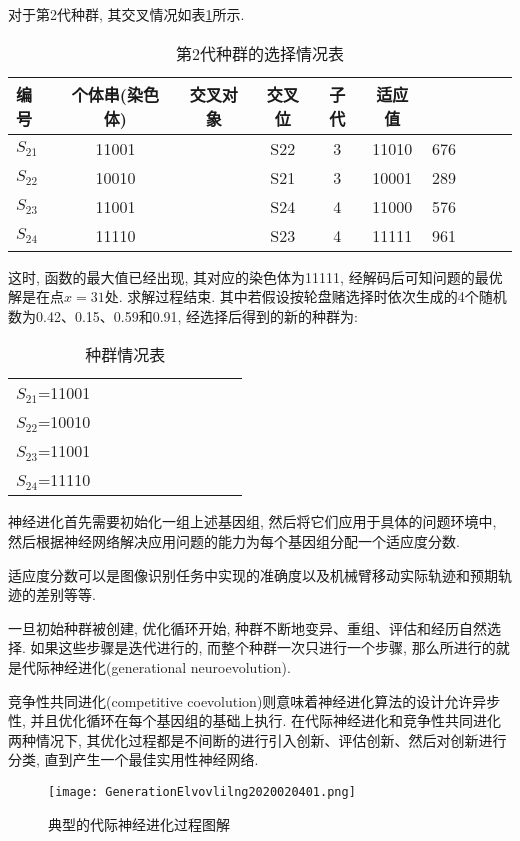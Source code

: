 对于第2代种群, 其交叉情况如表\ref{AI_table2019112810}所示.
\begin{table} [H]
\caption{第2代种群的选择情况表}
\begin{center}
\begin{tabular} {lccccccccc}
  \hline
编号&	个体串(染色体)&	交叉对象&	交叉位&子代&适应值\\
  \hline
$S_{21}$&	11001&	    &S22	&3	&11010&	676\\
$S_{22}$&	10010&	    &S21    &3	&10001&	289\\
$S_{23}$&	11001&	    &S24	&4	&11000&	576\\
$S_{24}$&	11110&	   & S23	&4	&11111&	961\\
\hline
\end{tabular}
\end{center}
\label{AI_table2019112810}
\end{table}
这时, 函数的最大值已经出现, 其对应的染色体为11111, 经解码后可知问题的最优解是在点$x=31$处. 求解过程结束.
其中若假设按轮盘赌选择时依次生成的4个随机数为0.42、0.15、0.59和0.91, 经选择后得到的新的种群为:
\begin{table} [H]
\caption{种群情况表}
\begin{center}
\begin{tabular} {lccccccccc}
\hline
$S_{21}$=11001\\
$S_{22}$=10010\\
$S_{23}$=11001\\
$S_{24}$=11110\\
\hline
\end{tabular}
\end{center}
\end{table}
\begin{remark}
    神经进化首先需要初始化一组上述基因组, 然后将它们应用于具体的问题环境中, 然后根据神经网络解决应用问题的能力为每个基因组分配一个适应度分数.
\begin{newexam}
    适应度分数可以是图像识别任务中实现的准确度以及机械臂移动实际轨迹和预期轨迹的差别等等.
\end{newexam}

一旦初始种群被创建, 优化循环开始, 种群不断地变异、重组、评估和经历自然选择.
如果这些步骤是迭代进行的, 而整个种群一次只进行一个步骤, 那么所进行的就是代际神经进化(generational neuroevolution).

竞争性共同进化(competitive coevolution)则意味着神经进化算法的设计允许异步性, 并且优化循环在每个基因组的基础上执行. 在代际神经进化和竞争性共同进化两种情况下, 其优化过程都是不间断的进行引入创新、评估创新、然后对创新进行分类, 直到产生一个最佳实用性神经网络.
\begin{figure}[H]
\centering
\texttt{[image: GenerationElvovlilng2020020401.png]}
\caption{典型的代际神经进化过程图解}
\label{GenerationElvovlilng2020020401}
\end{figure}
\end{remark}
